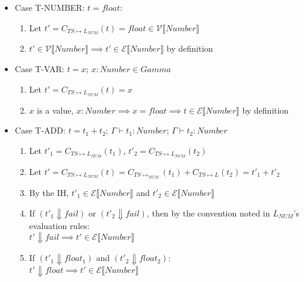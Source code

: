 \documentclass{article}
\newcommand{\denoteset}[2]{\mathcal{#1} \llbracket #2 \rrbracket}
\begin{document}
	\begin{itemize}
		\item Case T-NUMBER: $t = float$:
		\begin{enumerate}
			\item Let $t' = C_{TS \mapsto L_{NUM}}(t) = float \in \denoteset{V}{Number}$
			\item $t' \in \denoteset{V}{Number} \implies t' \in \denoteset{E}{Number}$ by definition
		\end{enumerate}
		
		\item Case T-VAR: $t = x$; $x: Number \in Gamma$
		\begin{enumerate}
			\item Let $t' = C_{TS \mapsto L_{NUM}}(t) = x$
			\item $x$ is a value, $x: Number \implies x = float \implies t \in \denoteset{E}{Number}$ by definition
		\end{enumerate}
	
		\item Case T-ADD: $t = t_1 + t_2$; $\Gamma \vdash t_1: Number$; $\Gamma \vdash t_2: Number$
		\begin{enumerate}
			\item Let $t'_1 = C_{TS \mapsto L_{NUM}}(t_1)$, $t'_2 = C_{TS \mapsto L_{NUM}}(t_2)$
			\item Let $t' = C_{TS \mapsto L_{NUM}}(t) = C_{TS \mapsto _{NUM}}(t_1) + C_{TS \mapsto L}(t_2) = t'_1 + t'_2$
			\item By the IH, $t'_1 \in \denoteset{E}{Number}$ and $t'_2 \in \denoteset{E}{Number}$
			\item If $(t'_1 \Downarrow fail)$ or $(t'_2 \Downarrow fail)$, then by the convention noted in $L_{NUM}$'s evaluation rules:\\
				$t' \Downarrow fail \implies t' \in \denoteset{E}{Number}$
			\item If $(t'_1 \Downarrow float_1)$ and $(t'_2 \Downarrow float_2)$:\\
				$t' \Downarrow float \implies t' \in \denoteset{E}{Number}$
		\end{enumerate}
	

\end{itemize}
\end{document}
